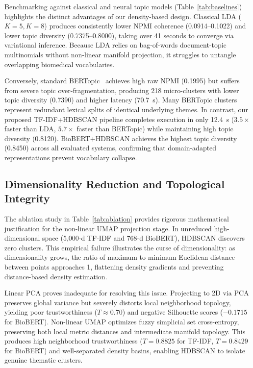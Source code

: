 \documentclass[a4paper,fleqn]{cas-dc}
\begin{document}
Benchmarking against classical and neural topic models (Table~\ref{tab:baselines}) highlights the distinct advantages of our density-based design. Classical LDA ($K=5, K=8$) produces consistently lower NPMI coherence (0.0914--0.1022) and lower topic diversity (0.7375--0.8000), taking over 41 seconds to converge via variational inference. Because LDA relies on bag-of-words document-topic multinomials without non-linear manifold projection, it struggles to untangle overlapping biomedical vocabularies.

Conversely, standard BERTopic~\cite{ref17} achieves high raw NPMI (0.1995) but suffers from severe topic over-fragmentation, producing 218 micro-clusters with lower topic diversity (0.7390) and higher latency (70.7~s). Many BERTopic clusters represent redundant lexical splits of identical underlying themes. In contrast, our proposed TF-IDF+HDBSCAN pipeline completes execution in only 12.4~s ($3.5\times$ faster than LDA, $5.7\times$ faster than BERTopic) while maintaining high topic diversity (0.8120). BioBERT+HDBSCAN achieves the highest topic diversity (0.8450) across all evaluated systems, confirming that domain-adapted representations prevent vocabulary collapse.

\subsection{Dimensionality Reduction and Topological Integrity}

The ablation study in Table~\ref{tab:ablation} provides rigorous mathematical justification for the non-linear UMAP projection stage. In unreduced high-dimensional space (5,000-d TF-IDF and 768-d BioBERT), HDBSCAN discovers zero clusters. This empirical failure illustrates the curse of dimensionality: as dimensionality grows, the ratio of maximum to minimum Euclidean distance between points approaches 1, flattening density gradients and preventing distance-based density estimation.

Linear PCA proves inadequate for resolving this issue. Projecting to 2D via PCA preserves global variance but severely distorts local neighborhood topology, yielding poor trustworthiness ($T \approx 0.70$) and negative Silhouette scores ($-0.1715$ for BioBERT). Non-linear UMAP optimizes fuzzy simplicial set cross-entropy, preserving both local metric distances and intermediate manifold topology. This produces high neighborhood trustworthiness ($T=0.8825$ for TF-IDF, $T=0.8429$ for BioBERT) and well-separated density basins, enabling HDBSCAN to isolate genuine thematic clusters.
\end{document}
